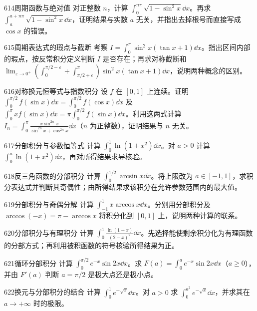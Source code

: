 \begin{exercise}{614}{周期函数与绝对值}
对正整数 $n$，计算 $\int_0^{n\pi}\sqrt{1-\sin^2x}\dd x$。再求 $\int_a^{a+n\pi}\sqrt{1-\sin^2x}\dd x$，证明结果与实数 $a$ 无关，并指出去掉根号而直接写成 $\cos x$ 的错误。
\end{exercise}
\begin{exercise}{615}{周期表达式的瑕点与截断}
考察 $I=\int_0^\pi\sin^2x(\tan x+1)\dd x$。指出区间内部的瑕点，按反常积分定义判断 $I$ 是否存在；再求对称截断和 $\lim_{\varepsilon\to0^+}(\int_0^{\pi/2-\varepsilon}+\int_{\pi/2+\varepsilon}^{\pi})\sin^2x(\tan x+1)\dd x$，说明两种概念的区别。
\end{exercise}
\begin{exercise}{616}{对称换元恒等式与指数积分}
设 $f$ 在 $[0,1]$ 上连续。证明 $\int_0^{\pi/2}f(\sin x)\dd x=\int_0^{\pi/2}f(\cos x)\dd x$ 及 $\int_0^\pi xf(\sin x)\dd x=\pi\int_0^{\pi/2}f(\sin x)\dd x$。利用这两式计算 $I_n=\int_0^\pi\frac{x\sin^{2n}x}{\sin^{2n}x+\cos^{2n}x}\dd x$（$n$ 为正整数），证明结果与 $n$ 无关。
\end{exercise}
\begin{exercise}{617}{分部积分与参数恒等式}
计算 $\int_0^1\ln(1+x^2)\dd x$。对 $a>0$ 计算 $\int_0^a\ln(1+x^2)\dd x$，再对所得结果求导核验。
\end{exercise}
\begin{exercise}{618}{反三角函数的分部积分}
计算 $\int_0^{1/2}\arcsin x\dd x$。将上限改为 $a\in[-1,1]$，求积分表达式并判断其奇偶性；由所得结果求该积分在允许参数范围内的最大值。
\end{exercise}
\begin{exercise}{619}{分部积分与奇偶分解}
计算 $\int_{-1}^1x\arccos x\dd x$。分别用分部积分及 $\arccos(-x)=\pi-\arccos x$ 将积分化到 $[0,1]$ 上，说明两种计算的联系。
\end{exercise}
\begin{exercise}{620}{分部积分与有理积分}
计算 $\int_0^1\frac{\ln(1+x)}{(2-x)^2}\dd x$。先选择能使剩余积分化为有理函数的分部方式；再利用被积函数的符号核验所得结果为正。
\end{exercise}
\begin{exercise}{621}{循环分部积分}
计算 $\int_0^{\pi/2}e^{-x}\sin2x\dd x$。求 $F(a)=\int_0^ae^{-x}\sin2x\dd x$（$a\ge0$），并由 $F'(a)$ 判断 $a=\pi/2$ 是极大点还是极小点。
\end{exercise}
\begin{exercise}{622}{换元与分部积分的结合}
计算 $\int_0^1e^{-\sqrt x}\dd x$。对 $a>0$ 求 $\int_0^{a^2}e^{-\sqrt x}\dd x$，并求其在 $a\to+\infty$ 时的极限。
\end{exercise}
